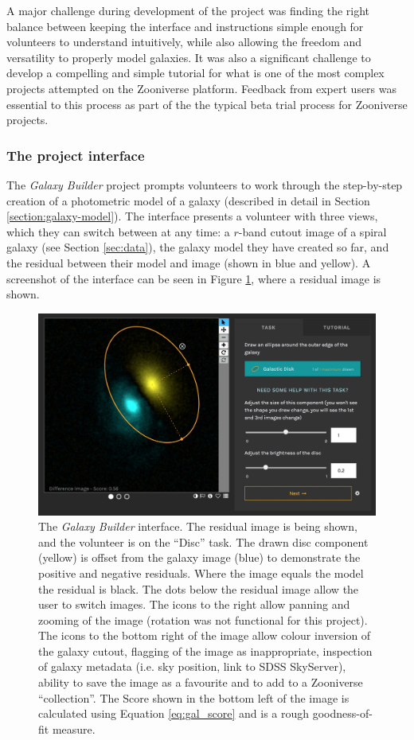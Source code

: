 \documentclass[../main.tex]{subfiles}
\begin{document}
A major challenge during development of the project was finding the right balance between keeping the interface and instructions simple enough for volunteers to understand intuitively, while also allowing the freedom and versatility to properly model galaxies. It was also a significant challenge to develop a compelling and simple tutorial for what is one of the most complex projects attempted on the Zooniverse platform. Feedback from expert users was essential to this process as part of the the typical beta trial process for Zooniverse projects.


\subsubsection{The project interface}

The \textit{Galaxy Builder} project prompts volunteers to work through the step-by-step creation of a photometric model of a galaxy (described in detail in Section \ref{section:galaxy-model}). The interface presents a volunteer with three views, which they can switch between at any time: a $r$-band cutout image of a spiral galaxy (see Section \ref{sec:data}), the galaxy model they have created so far, and the residual between their model and image (shown in blue and yellow). A screenshot of the interface can be seen in Figure \ref{fig:interfaceInProgress}, where a residual image is shown.

\begin{figure}
  \includegraphics[width=17.7cm]{images/interfaceInProgress.jpg}
  \caption{The \textit{Galaxy Builder} interface. The residual image is being shown, and the volunteer is on the ``Disc'' task. The drawn disc component (yellow) is offset from the galaxy image (blue) to demonstrate the positive and negative residuals. Where the image equals the model the residual is black. The dots below the residual image allow the user to switch images. The icons to the right allow panning and zooming of the image (rotation was not functional for this project). The icons to the bottom right of the image allow colour inversion of the galaxy cutout, flagging of the image as inappropriate, inspection of galaxy metadata (i.e. sky position, link to SDSS SkyServer), ability to save the image as a favourite and to add to a Zooniverse ``collection''. The Score shown in the bottom left of the image is calculated using Equation \ref{eq:gal_score} and is a rough goodness-of-fit measure.}
  \label{fig:interfaceInProgress}
\end{figure}
\end{document}
